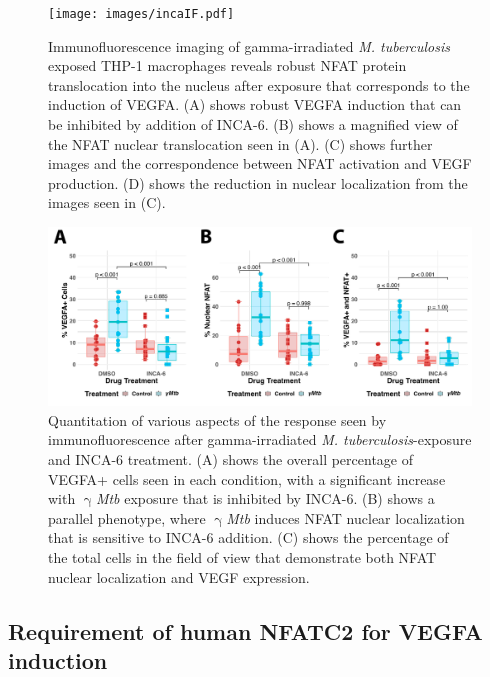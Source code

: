 \begin{figure}
\centering
\texttt{[image: images/incaIF.pdf]}
\caption{Immunofluorescence imaging of gamma\hyp{}irradiated \textit{M. tuberculosis} exposed THP\hyp{}1 macrophages reveals robust NFAT protein translocation into the nucleus after exposure that corresponds to the induction of VEGFA. (A) shows robust VEGFA induction that can be inhibited by addition of INCA\hyp{}6. (B) shows a magnified view of the NFAT nuclear translocation seen in (A). (C) shows further images and the correspondence between NFAT activation and VEGF production. (D) shows the reduction in nuclear localization from the images seen in (C).}
\label{figure:incaif}

\end{figure}

\begin{figure}
\centering
\includegraphics[width=\textwidth]{images/incaIFquant.pdf}
\caption{Quantitation of various aspects of the response seen by immunofluorescence after gamma\hyp{}irradiated \textit{M. tuberculosis}\hyp{}exposure and INCA\hyp{}6 treatment. (A) shows the overall percentage of VEGFA+ cells seen in each condition, with a significant increase with $\upgamma$\textit{Mtb} exposure that is inhibited by INCA\hyp{}6. (B) shows a parallel phenotype, where $\upgamma$\textit{Mtb} induces NFAT nuclear localization that is sensitive to INCA\hyp{}6 addition. (C) shows the percentage of the total cells in the field of view that demonstrate both NFAT nuclear localization and VEGF expression.}
\label{figure:incaquant}
\end{figure}

\subsection{Requirement of human NFATC2 for VEGFA induction}\label{thp1lenti}

